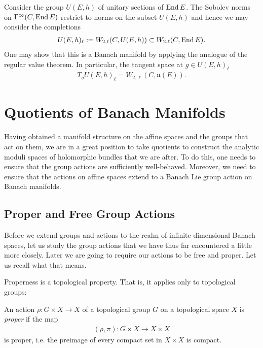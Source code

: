 \documentclass[12pt]{ociamthesis}  %
\begin{document}
\begin{example}
  Consider the group $U(E,h)$ of unitary
  sections of $\operatorname{End} E$. The Sobolev norms on $\Gamma^\infty(C,\operatorname{End} E)$
  restrict to norms on the subset $U(E,h)$ and hence we
  may consider the completions
  \begin{align*}
    U(E,h)_\ell := W_{2,\ell}(C,U(E,h)) \subset W_{2,\ell}(C,\operatorname{End} E).
  \end{align*}
  One may show that this is a Banach manifold by applying the
  analogue of the regular value theorem. In particular,
  the tangent space at $g\in U(E,h)_\ell$
  \begin{align*}
    T_g U(E,h)_\ell = W_{2,\ell}(C,\mathfrak u(E)).
  \end{align*}
\end{example}

\missingsection

\section{Quotients of Banach Manifolds}

Having obtained a manifold structure on the affine spaces and the groups
that act on them, we are in a great position to take quotients to construct
the analytic moduli spaces of holomorphic bundles that we are after. To do this,
one needs to ensure that the group actions are sufficiently well-behaved. Moreover,
we need to ensure that the actions on affine spaces extend to a Banach Lie group
action on Banach manifolds.

\subsection{Proper and Free Group Actions}

Before we extend groups and actions to the realm of infinite dimensional
Banach spaces, let us study the group actions that we have thus
far encountered a little more closely. Later we are going to require our
actions to be free and proper. Let us recall what that means.

Properness is a topological property. That is, it applies only to
topological groups:

\begin{definition}
  An action $\rho : G\times X\to X$ of a topological group $G$
  on a topological space $X$ is \emph{proper} if the map
  \begin{align}\label{eq:proper_map}
    (\rho,\pi) : G\times X \to X\times X
  \end{align}
  is proper, i.e. the preimage of every compact set in $X\times X$
  is compact.
\end{definition}
\end{document}
